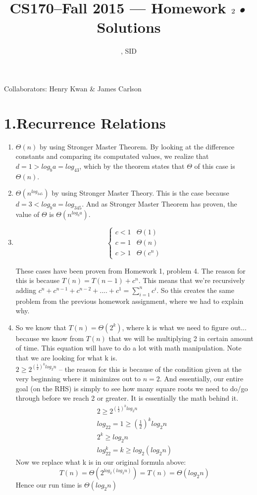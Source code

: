 \documentclass[11pt]{article}
\title{CS170--Fall 2015 --- Homework $2$\textsl{•} Solutions}
\author{\Name, SID \SID}
\date{}
\newenvironment{qparts}{\begin{enumerate}[{(}a{)}]}{\end{enumerate}}
\begin{document}
\maketitle

Collaborators: Henry Kwan \& James Carlson

\section*{1.Recurrence Relations}
\begin{qparts}
\item
$\Theta(n)$ by using Stronger Master Theorem. By looking at the difference constants and comparing its computated values, we realize that $d = 1 > log_ba = log_43$, which by the theorem states that $\Theta$ of this case is $\Theta(n)$.

\item
$\Theta(n^{log_345})$ by using Stronger Master Theory. This is the case because $d = 3 < log_ba = log_345$. And as Stronger Master Theorem has proven, the value of $\Theta$ is $\Theta(n^{log_ba})$.

\item
\[ \begin{cases} 
      c < 1 & \Theta(1) \\
      c = 1 & \Theta(n) \\
      c > 1 & \Theta(c^n)
   \end{cases}
\]

These cases have been proven from Homework 1, problem 4. The reason for this is because $T(n) = T(n-1) + c^n$. This means that we're recursively adding $c^n + c^{n-1} + c^{n-2} + .... + c^{1} = \sum_{i=1}^{n} c^i$. So this creates the same problem from the previous homework assignment, where we had to explain why. 

\item
So we know that $T(n) = \Theta(2^k)$, where k is what we need to figure out... because we know from $T(n)$ that we will be multiplying 2 in certain amount of time. This equation will have to do a lot with math manipulation. Note that we are looking for what k is. \\

$2 \geq 2^{(\frac{1}{2})^{k}log_2n}$ -- the reason for this is because of the condition given at the very beginning where it minimizes out to $n=2$. And essentially, our entire goal (on the RHS) is simply to see how many square roots we need to do/go through before we reach 2 or greater. It is essentially the math behind it.
\begin{align}
2 \geq 2^{(\frac{1}{2})^{k}log_2n} \\
log_22 = 1 \geq( \frac{1}{2})^{k}log_2n \\
2^k \geq log_2n \\
log_22^k = k \geq log_2(log_2n)
\end{align}
Now we replace what k is in our original formula above:
\begin{equation}
T(n) = \Theta(2^{log_2(log_2n)}) = T(n) = \Theta(log_2n)
\end{equation}
Hence our run time is $\Theta(log_2n)$


\end{qparts}
\end{document}
